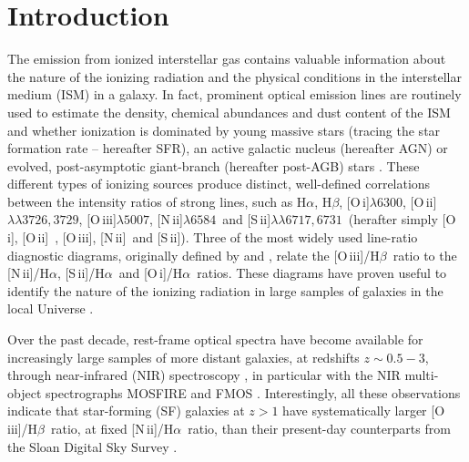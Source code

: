 \documentclass[fleqn,usenatbib]{mnras}
\newcommand{\ha}{\hbox{H$\alpha$}}
\newcommand{\hb}{\hbox{H$\beta$}}
\newcommand{\oiii}{\hbox{[O\,{\sc iii}]}}
\newcommand{\oiiilam}{\hbox{[O\,{\sc iii}]$\lambda5007$}}
\newcommand{\oiid}{\hbox{[O\,{\sc ii}]}}
\newcommand{\oiidlam}{\hbox{[O\,{\sc ii}]$\lambda\lambda3726,3729$}}
\newcommand{\oi}{\hbox{[O\,{\sc i}]}}
\newcommand{\oilam}{\hbox{[O\,{\sc i}]$\lambda6300$}}
\newcommand{\nii}{\hbox{[N\,{\sc ii}]}}
\newcommand{\niilam}{\hbox{[N\,{\sc ii}]$\lambda6584$}}
\newcommand{\siid}{\hbox{[S\,{\sc ii}]}}
\newcommand{\siidlam}{\hbox{[S\,{\sc ii}]$\lambda\lambda6717,6731$}}
\newcommand{\oiiihb}{\hbox{[O\,{\sc iii}]/H$\beta$}}
\newcommand{\niiha}{\hbox{[N\,{\sc ii}]/H$\alpha$}}
\newcommand{\siiha}{\hbox{[S\,{\sc ii}]/H$\alpha$}}
\newcommand{\oiha}{\hbox{[O\,{\sc i}]/H$\alpha$}}
\begin{document}
\section{Introduction}\label{intro}


The emission from ionized interstellar gas contains valuable
information about the nature of the ionizing radiation and the
physical conditions in the interstellar medium (ISM) in a galaxy. In
fact, prominent optical emission lines are routinely used to estimate
the density,  chemical abundances and dust content of the ISM and
whether ionization is dominated by  young massive stars (tracing the
star formation rate -- hereafter SFR), an active galactic nucleus
(hereafter AGN) or evolved, post-asymptotic giant-branch (hereafter
post-AGB) stars  \citep[e.g.,][]{Izotov99, Kobulnicky99, Kauffmann03,
  Nagao06, Kewley08, Morisset16}. These different types of ionizing
sources produce distinct, well-defined correlations between the
intensity ratios of strong lines, such as \ha, \hb, \oilam, \oiidlam,
\oiiilam, \niilam\ and  \siidlam\ (herafter simply \oi, \oiid\ ,
\oiii, \nii\ and \siid). Three of the most widely used line-ratio
diagnostic  diagrams, originally defined by \citet[][hereafter
BPT]{Baldwin81} and \citet{Veilleux87},  relate the \oiiihb\ ratio to
the \niiha, \siiha\ and \oiha\ ratios. These diagrams have proven
useful to  identify  the nature of the ionizing radiation in large
samples of galaxies in the local Universe  \citep[e.g.,][]{Kewley01,
  Kauffmann03}.  

Over the past decade, rest-frame optical spectra have become available
for increasingly large samples of more distant galaxies, at redshifts
$z \sim 0.5-3$, through near-infrared (NIR)  spectroscopy
\citep[e.g.,][]{Pettini04, Hainline09, Steidel14,  Shapley15}, in
particular with the NIR multi-object spectrographs MOSFIRE
\citep{McLean10} and FMOS \citep{Kimura10}. Interestingly, all these
observations indicate that star-forming (SF) galaxies at $z>1$ have
systematically larger \oiiihb\ ratio, at fixed \niiha\ ratio, than
their present-day counterparts from the Sloan Digital Sky Survey
\citep[SDSS; see, e.g.,][]{Shapley05, Lehnert09,
  Yabe12,  Steidel14,  Shapley15, Strom17}.  
\end{document}
